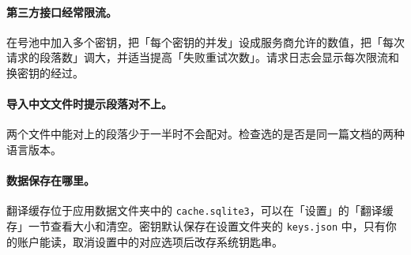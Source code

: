 \documentclass[UTF8,a4paper,11pt]{ctexart}
\newcommand{\ui}[1]{「#1」}
\begin{document}
\paragraph{第三方接口经常限流。}在号池中加入多个密钥，把\ui{每个密钥的并发}设成服务商允许的数值，把\ui{每次请求的段落数}调大，并适当提高\ui{失败重试次数}。请求日志会显示每次限流和换密钥的经过。

\paragraph{导入中文文件时提示段落对不上。}两个文件中能对上的段落少于一半时不会配对。检查选的是否是同一篇文档的两种语言版本。

\paragraph{数据保存在哪里。}翻译缓存位于应用数据文件夹中的 \texttt{cache.sqlite3}，可以在\ui{设置}的\ui{翻译缓存}一节查看大小和清空。密钥默认保存在设置文件夹的 \texttt{keys.json} 中，只有你的账户能读，取消设置中的对应选项后改存系统钥匙串。
\end{document}
